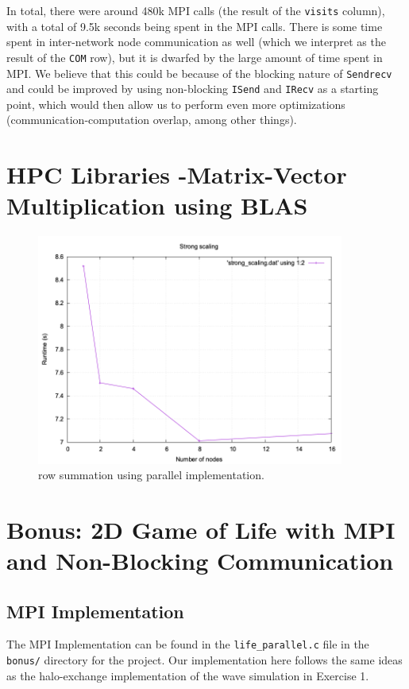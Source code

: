 \documentclass[a4paper,10pt]{article}
\begin{document}
In total, there were around 480k MPI calls (the result of the \verb|visits| column), with a total of 9.5k seconds being spent in the MPI calls. There is some time spent in inter-network node communication as well (which we interpret as the result of the \verb|COM| row), but it is dwarfed by the large amount of time spent in MPI. We believe that this could be because of the blocking nature of \verb|Sendrecv| and could be improved by using non-blocking \verb|ISend| and \verb|IRecv| as a starting point, which would then allow us to perform even more optimizations (communication-computation overlap, among other things).

\section{HPC Libraries -Matrix-Vector Multiplication using BLAS}

\begin{figure}[H]
  \centering
  \includegraphics[width=0.9\textwidth]{img/ex4_strong_scaling}
  \caption{row summation using parallel implementation.}
  \label{fig:ex4_strong_scaling}
\end{figure}

\section{Bonus: 2D Game of Life with MPI and Non-Blocking Communication}
\subsection{MPI Implementation}
The MPI Implementation can be found in the \verb|life_parallel.c| file in the \verb|bonus/| directory for the project. Our implementation here follows the same ideas as the halo-exchange implementation of the wave simulation in Exercise 1. 
\end{document}
